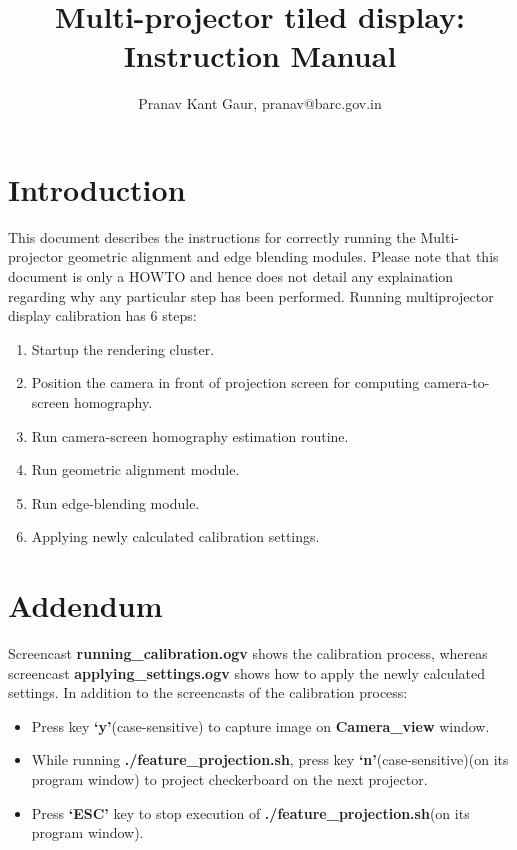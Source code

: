 \documentclass{article}
\begin{document}
\title{Multi-projector tiled display: Instruction Manual}
\author{Pranav Kant Gaur, pranav@barc.gov.in}
\maketitle

\section{Introduction}
This document describes the instructions for correctly running the Multi-projector geometric alignment and edge blending modules. Please note that this document is only a HOWTO and hence does not detail any explaination regarding why any particular step has been performed. Running multiprojector display calibration has 6 steps:
\begin{enumerate}
\item Startup the rendering cluster.
\item Position the camera in front of projection screen for computing camera-to-screen homography.
\item Run camera-screen homography estimation routine.
\item Run geometric alignment module.
\item Run edge-blending module.
\item Applying newly calculated calibration settings.
\end{enumerate}


\section{Addendum}
Screencast \textbf{running\_calibration.ogv} shows the calibration process, whereas screencast \textbf{applying\_settings.ogv} shows how to apply the newly calculated settings. In addition to the screencasts of the calibration process:
\begin{itemize}
\item Press key \textbf{\lq y\rq}(case-sensitive) to capture image on \textbf{Camera\_view} window.
\item While running \textbf{./feature\_projection.sh}, press key \textbf{\lq n\rq}(case-sensitive)(on its program window) to project checkerboard on the next projector.
\item Press \textbf{\lq ESC\rq} key to stop execution of \textbf{./feature\_projection.sh}(on its program window).
\end{itemize}
\end{document}
